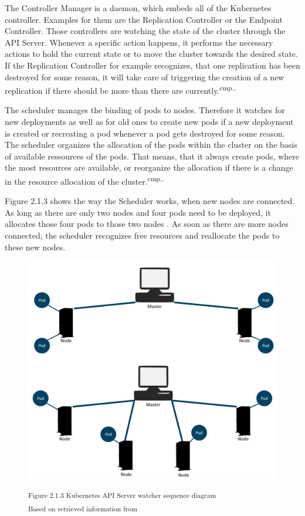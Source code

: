 The Controller Manager is a daemon, which embeds all of the Kubernetes controller. Examples for them are the Replication Controller or the Endpoint Controller. Those controllers are watching the state of the cluster through the API Server. Whenever a specific action happens, it performs the necessary actions to hold the current state or to move the cluster towards the desired state. If the Replication Controller for example recognizes, that one replication has been destroyed for some reason, it will take care of triggering the creation of a new replication if there should be more than there are currently.\textsuperscript{cmp.\cite{13}, \cite{16}}

The scheduler manages the binding of pods to nodes. Therefore it watches for new deployments as well as for old ones to create new pods if a new deployment is created or recreating a pod whenever a pod gets destroyed for some reason. The scheduler organizes the allocation of the pods within the cluster on the basis of available ressources of the pods. That means, that it always create pods, where the most resources are available, or reorganize the allocation if there is a change in the resource allocation of the cluster.\textsuperscript{cmp.\cite{13}, \cite{16}}%

Figure 2.1.3 shows the way the Scheduler works, when new nodes are connected. As long as there are only two nodes and four pods need to be deployed, it allocates those four pods to those two nodes . As soon as there are more nodes connected, the scheduler recognizes free resources and reallocate the pods to these new nodes.

\begin{figure}[h]
\centering
\includegraphics[width=\textwidth/5*3]{images/kubernetes_scheduler.png}

\textsuperscript{Figure 2.1.3 Kubernetes API Server watcher sequence diagram} \\
\textsuperscript{Based on retrieved information from \cite{17}}
\end{figure}

